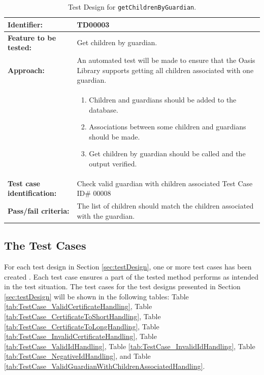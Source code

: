 \begin{table}[H]
	\centering
		\begin{tabular}{| p{4.5cm} | m{9cm} |}
			\hline
			\textbf{Identifier:} 				& TD00003 \\ \hline
			\textbf{Feature to be tested:}		& Get children by guardian. \\ \hline
			\textbf{Approach:}					& An automated test will be made to ensure that the Oasis Library supports getting all children associated with one guardian. \\
										&	\begin{enumerate}
												\item Children and guardians should be added to the database.
												\item Associations between some children and guardians should be made.
												\item Get children by guardian should be called and the output verified.
											\end{enumerate} \\ \hline
			\textbf{Test case identification:} 	& Check valid guardian with children associated Test Case ID\# 00008 \\ \hline
			\textbf{Pass/fail criteria:}			& The list of children should match the children associated with the guardian. \\ \hline
		\end{tabular}
	\caption{Test Design for \texttt{getChildrenByGuardian}.}
	\label{tab:TestDesign_GetChildrenByGuardian}
\end{table}



\subsection{The Test Cases}
For each test design in Section \vref{sec:testDesign}, one or more test cases has been created \cite[pp283]{Testing}.
Each test case ensures a part of the tested method performs as intended in the test situation.
The test cases for the test designs presented in Section \vref{sec:testDesign} will be shown in the following tables:
Table \vref{tab:TestCase_ValidCertificateHandling}, 
Table \vref{tab:TestCase_CertificateToShortHandling},
Table \vref{tab:TestCase_CertificateToLongHandling},
Table \vref{tab:TestCase_InvalidCertificateHandling},
Table \vref{tab:TestCase_ValidIdHandling},
Table \vref{tab:TestCase_InvalidIdHandling},
Table \vref{tab:TestCase_NegativeIdHandling}, 
and Table \vref{tab:TestCase_ValidGuardianWithChildrenAssociatedHandling}.

